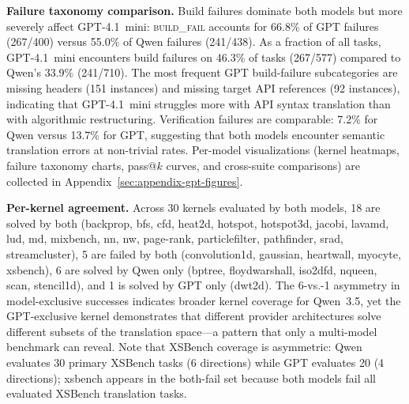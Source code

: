 \documentclass[conference]{IEEEtran}
\begin{document}
\textbf{Failure taxonomy comparison.}
Build failures dominate both models but more severely affect GPT-4.1~mini:
\textsc{build\_fail} accounts for 66.8\% of GPT failures (267/400) versus
55.0\% of Qwen failures (241/438). As a fraction of all tasks, GPT-4.1~mini
encounters build failures on 46.3\% of tasks (267/577) compared to Qwen's
33.9\% (241/710). The most frequent GPT build-failure subcategories are
missing headers (151 instances) and missing target API references (92
instances), indicating that GPT-4.1~mini struggles more with API syntax
translation than with algorithmic restructuring. Verification failures
are comparable: 7.2\% for Qwen versus 13.7\% for GPT, suggesting that
both models encounter semantic translation errors at non-trivial rates.
Per-model visualizations (kernel heatmaps, failure taxonomy charts,
pass@$k$ curves, and cross-suite comparisons) are collected in
Appendix~\ref{sec:appendix-gpt-figures}.

\textbf{Per-kernel agreement.}
Across 30 kernels evaluated by both models, 18 are solved by both
(backprop, bfs, cfd, heat2d, hotspot, hotspot3d, jacobi, lavamd, lud, md,
mixbench, nn, nw, page-rank, particlefilter, pathfinder, srad,
streamcluster), 5 are failed by both (convolution1d, gaussian, heartwall,
myocyte, xsbench), 6 are solved by Qwen only (bptree, floydwarshall,
iso2dfd, nqueen, scan, stencil1d), and 1 is solved by GPT only (dwt2d).
The 6-vs.-1 asymmetry in model-exclusive successes indicates broader
kernel coverage for Qwen~3.5, yet the GPT-exclusive kernel demonstrates
that different provider architectures solve different subsets of the
translation space---a pattern that only a multi-model benchmark can
reveal. Note that XSBench coverage is asymmetric: Qwen evaluates
30 primary XSBench tasks (6 directions) while GPT evaluates 20
(4 directions); xsbench appears in the both-fail set because
both models fail all evaluated XSBench translation tasks.
\end{document}
